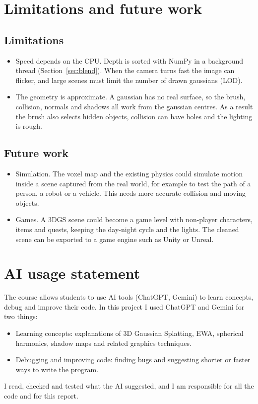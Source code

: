 \documentclass[9pt,twocolumn,a4paper]{extarticle}
\begin{document}
\section{Limitations and future work}
\label{chap:future}
\subsection{Limitations}
\begin{itemize}\itemsep0pt
\item Speed depends on the CPU. Depth is sorted with NumPy in a background thread (Section~\ref{sec:blend}). When the camera turns fast the image can flicker, and large scenes must limit the number of drawn gaussians (LOD).
\item The geometry is approximate. A gaussian has no real surface, so the brush, collision, normals and shadows all work from the gaussian centres. As a result the brush also selects hidden objects, collision can have holes and the lighting is rough.
\end{itemize}

\subsection{Future work}
\begin{itemize}\itemsep0pt
\item Simulation. The voxel map and the existing physics could simulate motion inside a scene captured from the real world, for example to test the path of a person, a robot or a vehicle. This needs more accurate collision and moving objects.
\item Games. A 3DGS scene could become a game level with non-player characters, items and quests, keeping the day-night cycle and the lights. The cleaned scene can be exported to a game engine such as Unity or Unreal.
\end{itemize}

\section{AI usage statement}
\label{chap:ai}
The course allows students to use AI tools (ChatGPT, Gemini) to learn concepts, debug and improve their code. In this project I used ChatGPT and Gemini for two things:
\begin{itemize}\itemsep0pt
\item Learning concepts: explanations of 3D Gaussian Splatting, EWA, spherical harmonics, shadow maps and related graphics techniques.
\item Debugging and improving code: finding bugs and suggesting shorter or faster ways to write the program.
\end{itemize}
I read, checked and tested what the AI suggested, and I am responsible for all the code and for this report.
\end{document}
